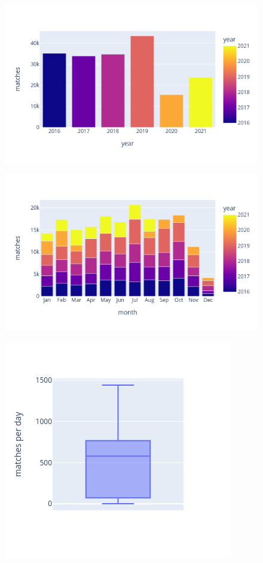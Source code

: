 \documentclass{article}
\begin{document}
\begin{figure}[h]
\centering
    \begin{minipage}{.5\textwidth}
        \centering
        \includegraphics[width=\textwidth]{tourney_date_matches_per_year}
        \label{fig:matches_per_year}
    \end{minipage}%
    \begin{minipage}{.5\textwidth}
        \centering
        \includegraphics[width=\textwidth]{tourney_date_matches_per_year_and_month}
        \label{fig:matches_per_year_and_month}
    \end{minipage}
    \begin{minipage}{.5\textwidth}
        \centering
        \includegraphics[width=.5\textwidth]{tourney_date_matches_per_day}
        \label{fig:matches_per_day}
    \end{minipage}
\end{figure}
\end{document}
